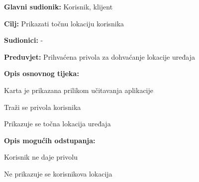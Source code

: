 					\noindent {}
					\begin{packed_item}
	
						\item \textbf{Glavni sudionik: }Korisnik, klijent
						\item  \textbf{Cilj:} Prikazati točnu lokaciju korisnika
						\item  \textbf{Sudionici:} -
						\item  \textbf{Preduvjet:} Prihvaćena privola za dohvaćanje lokacije uređaja
						\item  \textbf{Opis osnovnog tijeka:}
						
						\item[] \begin{packed_enum}
	
							\item Karta je prikazana prilikom učitavanja aplikacije
							\item Traži se privola korisnika
							\item Prikazuje se točna lokacija uređaja

						\end{packed_enum}
						
						\item  \textbf{Opis mogućih odstupanja:}
						
						\item[] \begin{packed_item}
	
							\item[2.a] Korisnik ne daje privolu
							\item[] \begin{packed_enum}
								
								\item Ne prikazuje se korisnikova lokacija
								
							\end{packed_enum}
							
						\end{packed_item}
						
					\end{packed_item}
					
